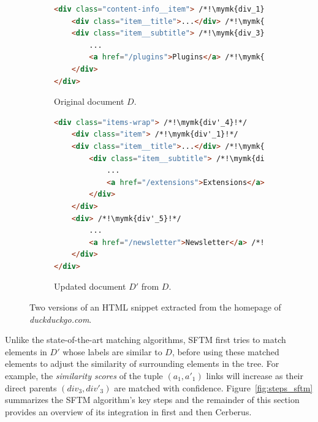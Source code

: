 \documentclass[10pt,conference]{IEEEtran}
\newcommand{\mymk}[1]{%
  \tikz[baseline=(char.base)]\node[anchor=south west, draw, circle, inner sep=1pt, minimum size=4mm, text height=2mm](char){\ensuremath{#1}};}
\begin{document}
\begin{figure}
    \centering
    \begin{subfigure}[b]{\linewidth}
        \centering
        \caption{Original document $D$.}
        \begin{lstlisting}[language=html, label={fig:first_version}]
<div class="content-info__item"> /*!\mymk{div_1}!*/
    <div class="item__title">...</div> /*!\mymk{div_2}!*/
    <div class="item__subtitle"> /*!\mymk{div_3}!*/
        ... 
        <a href="/plugins">Plugins</a> /*!\mymk{~a_1~}!*/
    </div>
</div>
        \end{lstlisting}
    \end{subfigure}
    \hfill
    \begin{subfigure}[b]{\linewidth}
        \centering
        \caption{Updated document $D'$ from $D$.}
        \begin{lstlisting}[language=html, label={fig:second_version}]
<div class="items-wrap"> /*!\mymk{div'_4}!*/
    <div class="item"> /*!\mymk{div'_1}!*/
    <div class="item__title">...</div> /*!\mymk{div'_2}!*/
        <div class="item__subtitle"> /*!\mymk{div'_3}!*/
            ... 
            <a href="/extensions">Extensions</a> /*!\mymk{~a'_1~}!*/
        </div>
    </div>
    <div> /*!\mymk{div'_5}!*/  
        ...
        <a href="/newsletter">Newsletter</a> /*!\mymk{~a'_2~}!*/
    </div>
</div>
        \end{lstlisting}
    \end{subfigure}
    \caption{Two versions of an HTML snippet extracted from the homepage of \emph{duckduckgo.com}.}
    \label{fig:example_html}
\end{figure}

Unlike the state-of-the-art matching algorithms, SFTM first tries to match elements in $D'$ whose labels are similar to $D$, before using these matched elements to adjust the similarity of surrounding elements in the tree.
For example, the \emph{similarity scores} of the tuple $(a_1,a'_1)$ links will increase as their direct parents $(div_3,div'_3)$ are matched with confidence.
% 
Figure~\ref{fig:steps_sftm} summarizes the SFTM algorithm's key steps and the remainder of this section provides an overview of its integration in \erratum{} first and then Cerberus.
\end{document}
